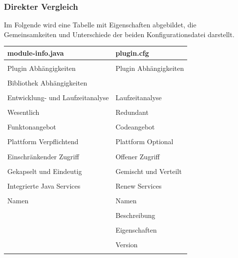 		\subsubsection{Direkter Vergleich} \label{sub:Direkter_Vergleich}
			Im Folgende wird eine Tabelle mit Eigenschaften abgebildet, die Gemeinsamkeiten und Unterschiede der beiden Konfigurationsdatei darstellt.\bigbreak
			\begin{table}[!h]
			\centering
			\begin{tabular}{l|l}
				\textbf{module-info.java} & \textbf{plugin.cfg} \\
				\hline
				\\[-1em]
				Plugin Abhängigkeiten & Plugin Abhängigkeiten \\
				\\[-1em]
			    Bibliothek Abhängigkeiten & \\
			    \\[-1em]
			    Entwicklung- und Laufzeitanalyse & Laufzeitanalyse \\
			    \\[-1em]
			    Wesentlich & Redundant \\
			    \\[-1em]
			    Funktonangebot & Codeangebot \\
			    \\[-1em]
			    Plattform Verpflichtend & Plattform Optional \\
			    \\[-1em]
			    Einschränkender Zugriff & Offener Zugriff \\
			    \\[-1em]
			    Gekapselt und Eindeutig & Gemischt und Verteilt \\
			    \\[-1em]
			    Integrierte Java Services & Renew Services \\
			    \\[-1em]
			    Namen & Namen \\
			    \\[-1em]
			    & Beschreibung \\
			    \\[-1em]
			    & Eigenschaften \\
			    \\[-1em]
			    & Version \\
			    \\[-1em]
			\end{tabular}
			\end{table}

